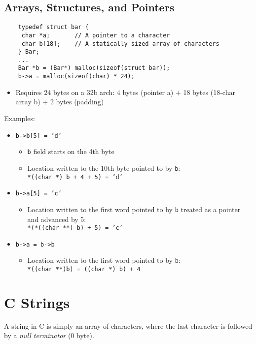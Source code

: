 \subsection{Arrays, Structures, and Pointers}
\begin{verbatim}
    typedef struct bar {
     char *a;       // A pointer to a character 
     char b[18];    // A statically sized array of characters
    } Bar;
    ...
    Bar *b = (Bar*) malloc(sizeof(struct bar));
    b->a = malloc(sizeof(char) * 24);
\end{verbatim}

\begin{itemize}
    \item Requires 24 bytes on a 32b arch: 4 bytes (pointer a) + 18 bytes (18-char array b) + 2 bytes (padding)
\end{itemize}

Examples:
\begin{itemize}
    \item \texttt{b->b[5] = 'd'}
    \begin{itemize}
        \item \texttt{b} field starts on the 4th byte
        \item Location written to the 10th byte pointed to by \texttt{b}: \\
        \texttt{*((char *) b + 4 + 5) = 'd'}
    \end{itemize}
    
    \item \texttt{b->a[5] = 'c'} 
    \begin{itemize}
        \item Location written to the first word pointed to by \texttt{b} treated as a pointer and advanced by 5: \\ \texttt{*(*((char **) b) + 5) = 'c'}
    \end{itemize}
    
    \item \texttt{b->a = b->b} 
    \begin{itemize}
        \item Location written to the first word pointed to by \texttt{b}: \\
        \texttt{*((char **)b) = ((char *) b) + 4}
    \end{itemize}
\end{itemize}

\section{C Strings}
A string in C is simply an array of characters, where the last character is followed by a \emph{null terminator} (0 byte).

